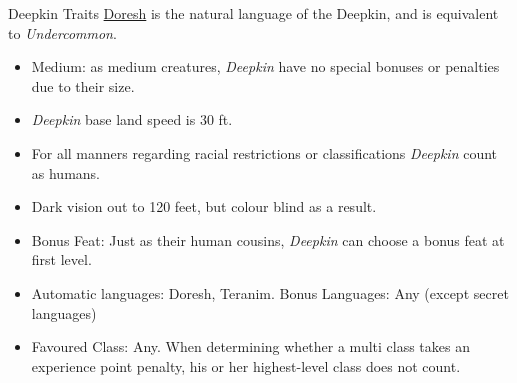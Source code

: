 \begin{35e}{Deepkin Traits}
  \hyperref[sec:Speak Language]{Doresh} is the natural language of the
  Deepkin, and is equivalent to \emph{Undercommon}.

  \begin{itemize}[noitemsep]
    \item Medium: as medium creatures, \emph{Deepkin} have no special bonuses or
    penalties due to their size.
    \item \emph{Deepkin} base land speed is 30 ft.
    \item For all manners regarding racial restrictions or classifications
    \emph{Deepkin} count as humans.
    \item Dark vision out to 120 feet, but colour blind as a result.
    \item Bonus Feat: Just as their human cousins, \emph{Deepkin} can choose a
    bonus feat at first level.
    \item Automatic languages: Doresh, Teranim. Bonus Languages: Any (except
      secret languages)
    \item Favoured Class: Any. When determining whether a multi class takes an
    experience point penalty, his or her highest-level class does not count.
  \end{itemize}
\end{35e}
